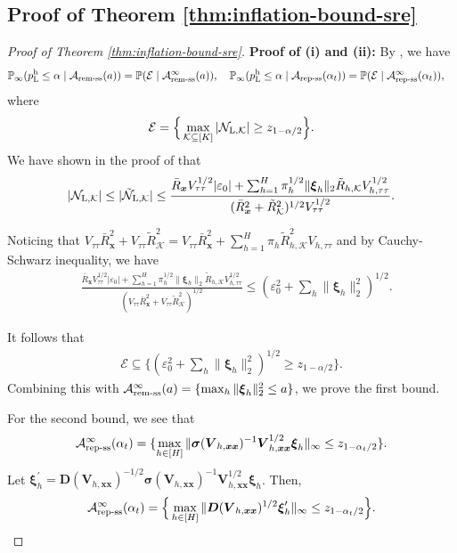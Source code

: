 \documentclass[12pt]{article}
\newcommand{\Lin}{\textnormal{L}}
\newcommand{\Prob}{\mathbb{P}}
\newcommand{\mk}{\mathcal{K}}
\newcommand{\ma}{\mathcal{A}}
\newcommand{\remss}{\textnormal{rem-ss}}
\newcommand{\repss}{\textnormal{rep-ss}}
\newcommand{\bs}{\boldsymbol}
\newcommand{\hpL}{p_\textnormal{L}^{\textnormal{h}}}
\begin{document}
\subsection{Proof of Theorem \ref{thm:inflation-bound-sre}}
\begin{proof}[Proof of Theorem \ref{thm:inflation-bound-sre}]
\noindent \textbf{Proof of  (i) and (ii):}
   By , we have
  \begin{align*}
        &\Prob_{\infty}( \hpL \leq \alpha\mid \ma_{\remss}(a)) = \Prob ( \mathcal{E} \mid \ma_{\remss}^\infty(a) ),\quad \Prob_{\infty}( \hpL \leq \alpha\mid \ma_{\repss}(\alpha_t)) = \Prob(\mathcal{E}\mid \ma_{\repss}^\infty(\alpha_t)),
    \end{align*}
    where
    \[
    \mathcal{E} = \Big\{\max_{\mk \subseteq [K]} |\mathcal{N}_{\Lin,\mk}| \geq z_{1-\alpha/2}\Big\}.
    \]
We have shown in the proof of   that 
\begin{align*}
  |\mathcal{N}_{\Lin,\mk}| \leq  |\tilde{\mathcal{N}}_{\Lin,\mk}| \leq \frac{\bar{R}_{\bs{x}} V_{\tau\tau}^{1/2}|\varepsilon_0|+\sum_{h=1}^H \pi_{ h }^{1/2}\|\bs{\xi}_{ h }\|_2\tilde{R}_{ h, \mk}V_{ h,\tau\tau}^{1/2}}{(\bar{R}_{\bs{x}}^2 +\tilde{R}^2_{\mk})^{1/2}V_{\tau\tau}^{1/2}}.
\end{align*}

Noticing that $V_{\tau\tau}\bar{R}_{\bs{x}}^2 +V_{\tau\tau}\tilde{R}^2_{\mk} = V_{\tau\tau}\bar{R}^2_{\bs{x}} +\sum_{h=1}^H \pi_{ h }\tilde{R}_{ h, \mk}^2V_{ h,\tau\tau}$ and by Cauchy-Schwarz inequality, we have
\begin{align*}
    &\frac{\bar{R}_{\bs{x}} V_{\tau\tau}^{1/2}|\varepsilon_0|+\sum_{h=1}^H \pi_{ h }^{1/2}\|\bs{\xi}_{ h }\|_2\tilde{R}_{ h, \mk}V_{ h,\tau\tau}^{1/2}}{(V_{\tau\tau}\bar{R}_{\bs{x}}^2 +V_{\tau\tau}\tilde{R}^2_{\mk})^{1/2}} \leq (\varepsilon_0^2+\sum_{h}\|\bs{\xi}_{ h }\|_2^2)^{1/2}.
\end{align*}

It follows that
\begin{align}
\label{eq:thm-S.3-1}
    \mathcal{E} \subseteq \Big\{(\varepsilon_0^2+\sum_{h}\|\bs{\xi}_{ h }\|_2^2)^{1/2} \geq z_{1-\alpha/2}\Big\}.
\end{align}
Combining this with $\ma_{\remss}^\infty(a) = \{\max_{h}\|\bs{\xi}_h\|_2^2\leq a\}$,
we prove the first bound.

For the second bound, we see that
\[
\ma_{\repss}^\infty(\alpha_t) = \{\max_{h\in  [H] } \|\bs{\sigma}(\bs{V}_{h,\bs{x}\bs{x}})^{-1}\bs{V}_{h, \bs{x}\bs{x}}^{1/2}\bs{\xi}_h\|_{\infty} \leq z_{1-\alpha_t/2}\}.
\]
Let $\bs{\xi}_h^\prime =\bs{D}(\bs{V}_{h,\bs{x}\bs{x}})^{-1/2} \bs{\sigma}(\bs{V}_{h,\bs{x}\bs{x}})^{-1}\bs{V}_{h, \bs{x}\bs{x}}^{1/2}\bs{\xi}_h$. Then,
\begin{align}
\label{eq:thm-S.3-2}
    \ma_{\repss}^\infty(\alpha_t) = \Big\{\max_{h\in  [H] } \|\bs{D}(\bs{V}_{h,\bs{x}\bs{x}})^{1/2}\bs{\xi}_h^\prime\|_{\infty} \leq z_{1-\alpha_t/2}\Big\}.
\end{align}


\end{proof}
\end{document}
